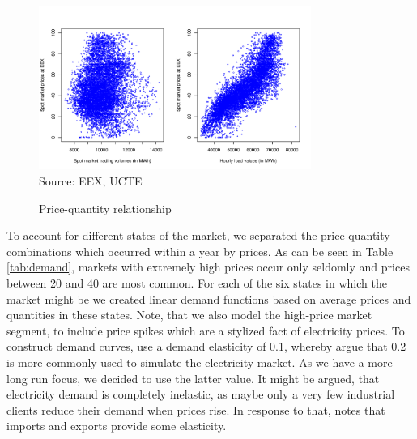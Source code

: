\begin{figure}[htb]
  \centering
\caption{Price-quantity relationship}
  \includegraphics[width=3.5in]{germandata/pricequant.pdf}
  \label{fig:pricequant}
\\
 \scriptsize Source: EEX, UCTE
\end{figure}

To account for different states of the market, we separated the price-quantity combinations which occurred within a year by prices. As can be seen in Table \ref{tab:demand}, markets with extremely high prices occur only seldomly and prices between 20 and 40 are most common. For each of the six states in which the market might be we created linear demand functions based on average prices and quantities in these states. Note, that we also model the high-price market segment, to include price spikes which are a stylized fact of electricity prices.  To construct demand curves, \cite{Neuhoff2005} use a demand elasticity of 0.1, whereby \cite{Genc2007} argue that 0.2 is more commonly used to simulate the electricity market. As we have a more long run focus, we decided to use the latter value. It might be argued, that electricity demand is completely inelastic, as maybe only a very few industrial clients reduce their demand when prices rise. In response to that, \cite{Bushnell2003} notes that imports and exports provide some elasticity.

